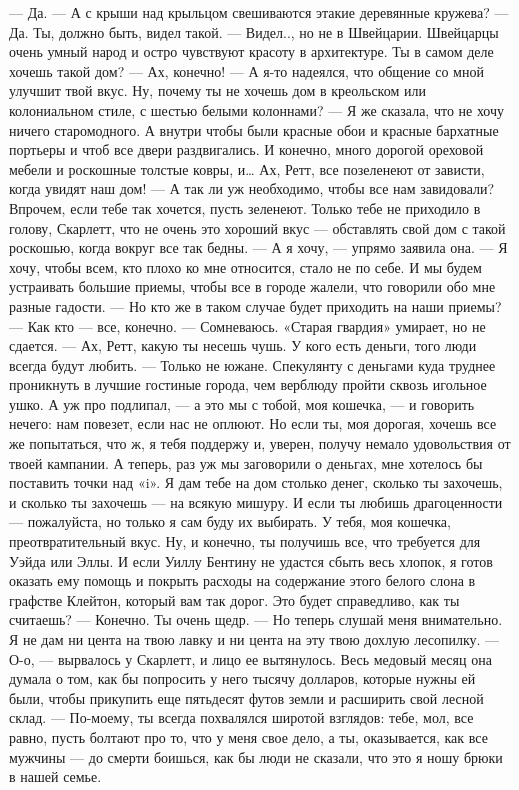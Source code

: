 — Да.
— А с крыши над крыльцом свешиваются этакие деревянные кружева?
— Да. Ты, должно быть, видел такой.
— Видел.., но не в Швейцарии. Швейцарцы очень умный народ и остро чувствуют красоту в архитектуре. Ты в самом деле хочешь такой дом?
— Ах, конечно!
— А я-то надеялся, что общение со мной улучшит твой вкус. Ну, почему ты не хочешь дом в креольском или колониальном стиле, с шестью белыми колоннами?
— Я же сказала, что не хочу ничего старомодного. А внутри чтобы были красные обои и красные бархатные портьеры и чтоб все двери раздвигались. И конечно, много дорогой ореховой мебели и роскошные толстые ковры, и… Ах, Ретт, все позеленеют от зависти, когда увидят наш дом!
— А так ли уж необходимо, чтобы все нам завидовали? Впрочем, если тебе так хочется, пусть зеленеют. Только тебе не приходило в голову, Скарлетт, что не очень это хороший вкус — обставлять свой дом с такой роскошью, когда вокруг все так бедны.
— А я хочу, — упрямо заявила она. — Я хочу, чтобы всем, кто плохо ко мне относится, стало не по себе. И мы будем устраивать большие приемы, чтобы все в городе жалели, что говорили обо мне разные гадости.
— Но кто же в таком случае будет приходить на наши приемы?
— Как кто — все, конечно.
— Сомневаюсь. «Старая гвардия» умирает, но не сдается.
— Ах, Ретт, какую ты несешь чушь. У кого есть деньги, того люди всегда будут любить.
— Только не южане. Спекулянту с деньгами куда труднее проникнуть в лучшие гостиные города, чем верблюду пройти сквозь игольное ушко. А уж про подлипал, — а это мы с тобой, моя кошечка, — и говорить нечего: нам повезет, если нас не оплюют. Но если ты, моя дорогая, хочешь все же попытаться, что ж, я тебя поддержу и, уверен, получу немало удовольствия от твоей кампании. А теперь, раз уж мы заговорили о деньгах, мне хотелось бы поставить точки над «i». Я дам тебе на дом столько денег, сколько ты захочешь, и сколько ты захочешь — на всякую мишуру. И если ты любишь драгоценности — пожалуйста, но только я сам буду их выбирать. У тебя, моя кошечка, преотвратительный вкус. Ну, и конечно, ты получишь все, что требуется для Уэйда или Эллы. И если Уиллу Бентину не удастся сбыть весь хлопок, я готов оказать ему помощь и покрыть расходы на содержание этого белого слона в графстве Клейтон, который вам так дорог. Это будет справедливо, как ты считаешь?
— Конечно. Ты очень щедр.
— Но теперь слушай меня внимательно. Я не дам ни цента на твою лавку и ни цента на эту твою дохлую лесопилку.
— О-о, — вырвалось у Скарлетт, и лицо ее вытянулось. Весь медовый месяц она думала о том, как бы попросить у него тысячу долларов, которые нужны ей были, чтобы прикупить еще пятьдесят футов земли и расширить свой лесной склад. — По-моему, ты всегда похвалялся широтой взглядов: тебе, мол, все равно, пусть болтают про то, что у меня свое дело, а ты, оказывается, как все мужчины — до смерти боишься, как бы люди не сказали, что это я ношу брюки в нашей семье.
